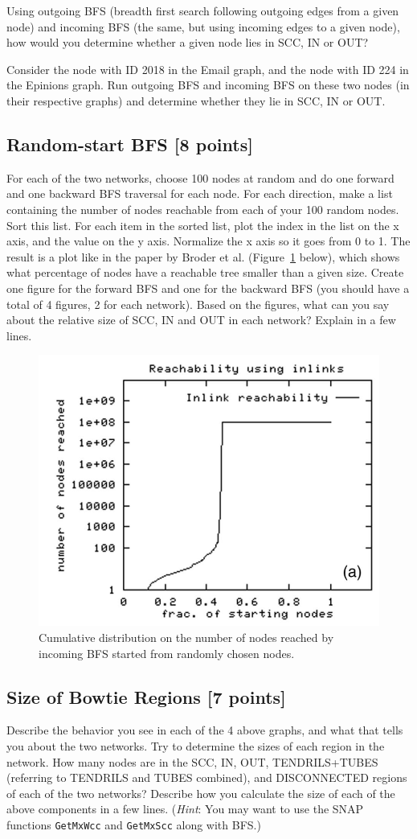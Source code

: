 Using outgoing BFS (breadth first search following outgoing edges from a given node) and incoming BFS (the same, but using incoming edges to a given node), how would you determine whether a given node lies in SCC, IN or OUT?

Consider the node with ID 2018 in the Email graph, and the node with ID 224 in the Epinions graph. Run outgoing BFS and incoming BFS on these two nodes (in their respective graphs) and determine whether they lie in SCC, IN or OUT. 

\subsection{Random-start BFS [8 points]}
For each of the two networks, choose 100 nodes at random and do one forward and one backward BFS traversal for each node.  For each direction, make a list containing the number of nodes reachable from each of your 100 random nodes. Sort this list. For each item in the sorted list, plot the index in the list on the x axis, and the value on the y axis. Normalize the x axis so it goes from 0 to 1. The result is a plot like in the paper by Broder et al. (Figure~\ref{fig:ins} below), which shows what percentage of nodes have a reachable tree smaller than a given size. Create one figure for the forward BFS and one for the backward BFS (you should have a total of 4 figures, 2 for each network). Based on the figures, what can you say about the relative size of SCC, IN and OUT in each network? Explain in a few lines. 

\begin{figure}[!htb]
\centering
  \includegraphics[width=0.45\columnwidth]{in.png}
  \caption{Cumulative distribution on the number of nodes reached by incoming BFS started from randomly chosen nodes.}
  \label{fig:ins}
\end{figure}

\subsection{Size of Bowtie Regions [7 points]}
Describe the behavior you see in each of the 4 above graphs, and what that tells you about the two networks. Try to determine the sizes of each region in the network. How many nodes are in the SCC, IN, OUT, TENDRILS+TUBES (referring to TENDRILS and TUBES combined), and DISCONNECTED regions of each of the two networks? Describe how you calculate the size of each of the above components in a few lines. (\textit{Hint}: You may want to use the SNAP functions \texttt{GetMxWcc} and \texttt{GetMxScc} along with BFS.) 

